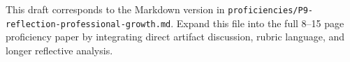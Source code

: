 \documentclass[12pt]{article}
\begin{document}
\begin{titlepage}\begin{center}\vspace*{0.2\textheight}{\Large\bfseries Proficiency 9: Reflection and Professional Growth\par}\vspace{2em}{\PortfolioAuthor\par}{\PortfolioAffiliation\par}{\PortfolioProgram\par}\vspace{2em}{\PortfolioDate\par}\end{center}\end{titlepage}
This draft corresponds to the Markdown version in \texttt{proficiencies/P9-reflection-professional-growth.md}. Expand this file into the full 8--15 page proficiency paper by integrating direct artifact discussion, rubric language, and longer reflective analysis.
\end{document}
